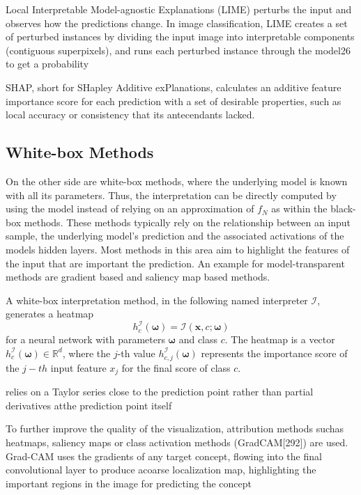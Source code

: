 Local Interpretable Model-agnostic Explanations (LIME) \cite{ribeiro2016should} perturbs the input and observes how the predictions change. In image classification,  LIME creates a set of perturbed instances by dividing the input image into interpretable components (contiguous superpixels), and runs each perturbed instance through the model26
to get a probability


 SHAP, short for SHapley Additive exPlanations, calculates an additive feature importance score for each prediction with a set of desirable properties, such as local accuracy or consistency that its antecendants lacked. 


\subsection{White-box Methods} %
\label{subsec:wb_methods}

On the other side are white-box methods, where the underlying model is known with all its parameters. Thus, the interpretation can be directly computed by using the model instead of relying on an approximation of $f_N$ as within the black-box methods. These methods typically rely on the relationship between an input sample, the underlying model's prediction and the associated activations of the models hidden layers. Most methods in this area aim to highlight the features of the input that are important the prediction.  
An example for model-transparent methods are gradient based and saliency map based methods. 

A white-box interpretation method, in the following named interpreter $\mathcal{I}$, generates a heatmap
 $$h_c^\mathcal{I}(\boldsymbol{\omega}) = \mathcal{I}(\mathbf{x}, c; \boldsymbol{\omega})$$
  for a neural network with parameters $\boldsymbol{\omega}$ and class $c$. The heatmap is a vector $h_c^\mathcal{I}(\boldsymbol{\omega}) \in \mathbb{R}^d$, where the $j$-th value $h_{c, j}^\mathcal{I}(\boldsymbol{\omega})$ represents the importance score of the $j-th$ input feature $x_j$ for the final score of class $c$.

relies on a Taylor series close to the prediction point rather than partial derivatives atthe prediction point itself

 \cite{selvaraju2017grad}
To further improve the quality of the visualization, attribution methods suchas heatmaps, saliency maps or class activation methods (GradCAM[292]) are used. Grad-CAM uses the gradients of any target concept, flowing into the final convolutional layer to produce acoarse localization map, highlighting the important regions in the image for predicting the concept

